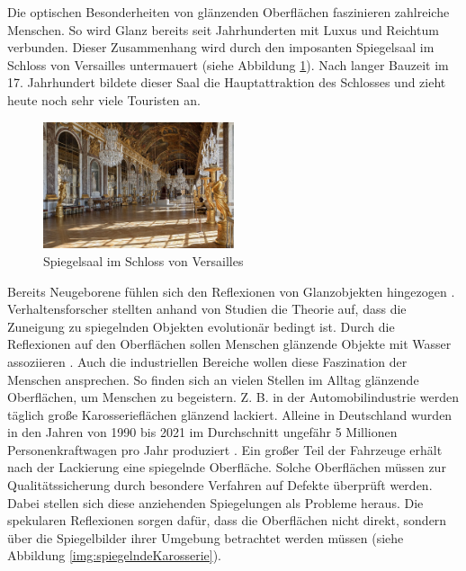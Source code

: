 Die optischen Besonderheiten von glänzenden Oberflächen faszinieren zahlreiche Menschen.
So wird Glanz bereits seit Jahrhunderten mit Luxus und Reichtum verbunden.
Dieser Zusammenhang wird durch den imposanten Spiegelsaal im Schloss von Versailles untermauert (siehe Abbildung \ref{img:spiegelSaal}).
Nach langer Bauzeit im 17. Jahrhundert bildete dieser Saal die Hauptattraktion des Schlosses und zieht heute noch sehr viele Touristen an.

{
	\begin{figure}[H]
		\centering
		\includegraphics[width=0.5\textwidth]{01_einfuehrung/figures/spiegelSaal}
		\caption[Spiegelsaal im Schloss von Versailles]{Spiegelsaal im Schloss von Versailles}
		\label{img:spiegelSaal}
	\end{figure}
}

\noindent
Bereits Neugeborene fühlen sich den Reflexionen von Glanzobjekten hingezogen \cite{shinyObjects}.
Verhaltensforscher stellten anhand von Studien die Theorie auf, dass die Zuneigung zu spiegelnden Objekten evolutionär bedingt ist.
Durch die Reflexionen auf den Oberflächen sollen Menschen glänzende Objekte mit Wasser assoziieren \cite{waterAndShininess}.
Auch die industriellen Bereiche wollen diese Faszination der Menschen ansprechen.
So finden sich an vielen Stellen im Alltag glänzende Oberflächen, um Menschen zu begeistern.
Z. B. in der Automobilindustrie werden täglich große Karosserieflächen glänzend lackiert.
Alleine in Deutschland wurden in den Jahren von 1990 bis 2021 im Durchschnitt ungefähr 5 Millionen Personenkraftwagen pro Jahr produziert \cite{statistaPKW}.
Ein großer Teil der Fahrzeuge erhält nach der Lackierung eine spiegelnde Oberfläche.
Solche Oberflächen müssen zur Qualitätssicherung durch besondere Verfahren auf Defekte überprüft werden.
Dabei stellen sich diese anziehenden Spiegelungen als Probleme heraus.
Die spekularen Reflexionen sorgen dafür, dass die Oberflächen nicht direkt, sondern über die Spiegelbilder ihrer Umgebung betrachtet werden müssen (siehe Abbildung \ref{img:spiegelndeKarosserie}).

